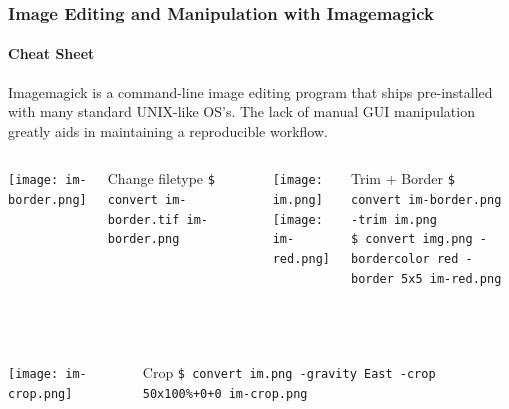 \documentclass[hyperref={colorlinks,citecolor=pink,linkcolor=red,urlcolor=blue}]{beamer}
\newcommand\Fontvii{\fontsize{7pt}{7.2}\selectfont}
\begin{document}
\begin{frame}
\frametitle{Image Editing and Manipulation with Imagemagick}
\framesubtitle{Cheat Sheet}
\Fontvii
\vspace{-20.5pt}

\vspace{4pt}
\begin{exampleblock}{}
Imagemagick is a command-line image editing program that ships pre-installed with many standard UNIX-like OS's. The lack of manual GUI manipulation greatly aids in maintaining a reproducible workflow.
\end{exampleblock}
\vspace{8.5pt}

\begin{minipage}[0.2\textheight]{\textwidth}
	\begin{columns}[T]
			\texttt{[image: im-border.png]}\\
			\begin{exampleblock}{Change filetype}
				\texttt{\$ convert im-border.tif im-border.png}
			\end{exampleblock}	
			\texttt{[image: im.png]}\\
			\texttt{[image: im-red.png]}
			\begin{exampleblock}{Trim + Border}
				\texttt{\$ convert im-border.png -trim im.png}\\
				\texttt{\$ convert img.png -bordercolor red -border 5x5 im-red.png}
			\end{exampleblock}	
	\end{columns}
\end{minipage}\\

\vspace{\abovedisplayskip}

\begin{minipage}[0.2\textheight]{\textwidth}
	\begin{columns}[T]
			\texttt{[image: im-crop.png]}\\
			\begin{exampleblock}{Crop}
				\texttt{\$ convert im.png -gravity East -crop 50x100\%+0+0 im-crop.png}\\
			\end{exampleblock}	
			

\end{columns}
\end{minipage}
\end{frame}
\end{document}
